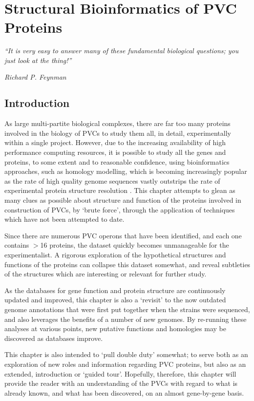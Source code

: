 \chapter{Structural Bioinformatics of PVC Proteins}\label{structbioinfo}

\epigraph{\emph{``It is very easy to answer many of these fundamental biological questions; you just look at the thing!''}}{\textit{Richard P. Feynman}}

\section{Introduction}

As large multi-partite biological complexes, there are far too many proteins involved in the biology of PVCs to study them all, in detail, experimentally within a single project. However, due to the increasing availability of high performance computing resources, it is possible to study all the genes and proteins, to some extent and to reasonable confidence, using bioinformatics approaches, such as homology modelling, which is becoming increasingly popular as the rate of high quality genome sequences vastly outstrips the rate of experimental protein structure resolution \citep{Rodriguez1998}. This chapter attempts to glean as many clues as possible about structure and function of the proteins involved in construction of PVCs, by `brute force', through the application of techniques which have not been attempted to date.

Since there are numerous PVC operons that have been identified, and each one contains $>$16 proteins, the dataset quickly becomes unmanageable for the experimentalist. A rigorous exploration of the hypothetical structures and functions of the proteins can collapse this dataset somewhat, and reveal subtleties of the structures which are interesting or relevant for further study. 

As the databases for gene function and protein structure are continuously updated and improved, this chapter is also a `revisit' to the now outdated genome annotations that were first put together when the strains were sequenced, and also leverages the benefits of a number of new genomes. By re-running these analyses at various points, new putative functions and homologies may be discovered as databases improve.

This chapter is also intended to `pull double duty' somewhat; to serve both as an exploration of new roles and information regarding PVC proteins, but also as an extended, introduction or `guided tour'. Hopefully, therefore, this chapter will provide the reader with an understanding of the PVCs with regard to what is already known, and what has been discovered, on an almost gene-by-gene basis.

